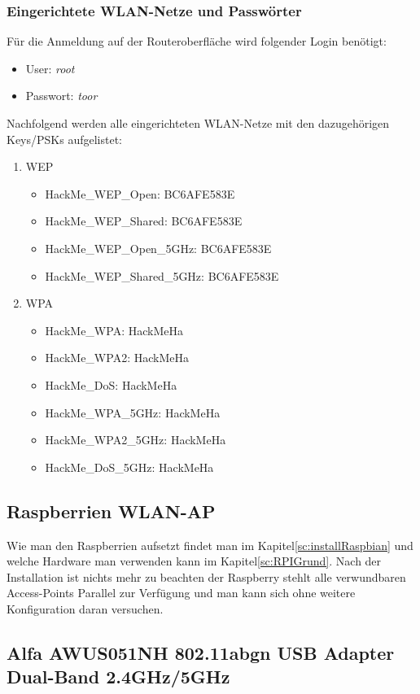 \subsubsection{Eingerichtete WLAN-Netze und Passwörter}
Für die Anmeldung auf der Routeroberfläche wird folgender Login benötigt:
\begin{itemize}
	\item User: \textit{root}
	\item Passwort: \textit{toor}
\end{itemize}
Nachfolgend werden alle eingerichteten WLAN-Netze mit den dazugehörigen Keys/PSKs aufgelistet:
\begin{enumerate}
	\item {WEP}
	\begin{itemize}
			\item HackMe\_WEP\_Open: BC6AFE583E
			\item HackMe\_WEP\_Shared: BC6AFE583E
			\item HackMe\_WEP\_Open\_5GHz: BC6AFE583E
			\item HackMe\_WEP\_Shared\_5GHz: BC6AFE583E
	\end{itemize}
	\item {WPA}
	\begin{itemize}
		\item HackMe\_WPA: HackMeHa
		\item HackMe\_WPA2: HackMeHa
		\item HackMe\_DoS: HackMeHa
		\item HackMe\_WPA\_5GHz: HackMeHa
		\item HackMe\_WPA2\_5GHz: HackMeHa
		\item HackMe\_DoS\_5GHz: HackMeHa
	\end{itemize}
\end{enumerate}

\subsection{Raspberrien WLAN-AP}
Wie man den Raspberrien aufsetzt findet man im Kapitel\ref{sc:installRaspbian} und welche Hardware man verwenden kann im Kapitel\ref{sc:RPIGrund}. Nach der Installation ist nichts mehr zu beachten der Raspberry stehlt alle verwundbaren Access-Points Parallel zur Verfügung und man kann sich ohne weitere Konfiguration daran versuchen.


\subsection{Alfa AWUS051NH 802.11abgn USB Adapter Dual-Band 2.4GHz/5GHz}

